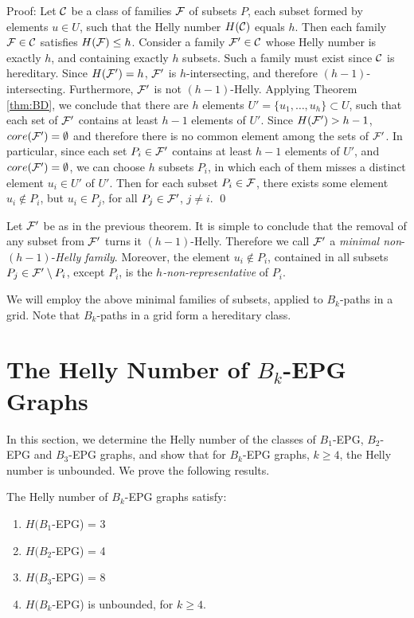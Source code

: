 Proof: 
Let ${\cal C}$ be a class of families ${\cal F}$ of subsets $P$, each subset formed by elements $u \in U$, such that the Helly number $H({\cal C})$ equals $h$. Then each family ${\cal F} \in {\cal C}$ satisfies $H({\cal F}) \leq h$. Consider a family ${\cal F'} \in {\cal C}$  whose Helly number is exactly $h$, and containing exactly $h$ subsets. Such a family must exist since ${\cal C}$ is hereditary. Since $H({\cal F'}) = h$, $\cal F'$ is $h$-intersecting, and therefore $(h-1)$-intersecting. Furthermore, ${\cal F'}$ is not $(h-1)$-Helly. Applying  Theorem \ref{thm:BD}, we conclude that there are $h$ elements $U' = \{u_1, \ldots, u_h\} \subset U$, such that each set of ${\cal F'}$ contains at least $h-1$ elements of $U'$. Since $H({\cal F'}) > h-1$, $core({\cal F'}) = \emptyset$ and therefore there is no common element among the sets of $\cal F'$. In particular, since each set $P_i \in {\cal F'}$ contains at least $h-1$ elements of $U'$, and $core(\cal F') = \emptyset$, we can choose $h$ subsets $P_i$, in which each of them misses a distinct element $u_i \in U'$ of $U'$. Then for each subset $P_i \in \cal F$, there exists some element $u_i \not \in P_i$, but $u_i \in P_j$, for all $P_j \in \cal F'$, $j \neq i$. \qed

Let $\cal{ F'}$ be as in the previous theorem. It is simple to conclude that the removal of any subset from $\cal {F'}$ turns it $(h-1)$-Helly.  Therefore we  call $\cal {F'}$ a {\it minimal non}-$(h-1)$-{\it Helly family}. Moreover, the element $u_i \not \in P_i$, contained in all subsets $P_j \in {\cal{F'}} \setminus P_i$, except $P_i$, is the {\it $h$-non-representative} of $P_i$.  

We will employ the above minimal families of subsets, applied to $B_k$-paths in a grid. Note that $B_k$-paths in a grid form a hereditary class. 

\section{The Helly Number of $B_k$-EPG Graphs}\label{sec:Helly-number}

In this section, we determine the Helly number of the classes of $B_1$-EPG, $B_2$-EPG and $B_3$-EPG graphs, and show that for $B_k$-EPG graphs, $k \geq 4$, the Helly number is unbounded. We prove the following results.

\begin{theorem}\label{thm:Helly-EPG}
The Helly number of $B_k$-EPG graphs satisfy:
\begin{enumerate}[nosep,label=\emph{(\roman*)}]
\item  $H(B_1$-EPG) = 3 
\item $H(B_2$-EPG)  = 4 
\item $H(B_3$-EPG)  = 8 
\item $H(B_k$-EPG) is unbounded, for 
$k \geq 4$.
\end{enumerate}

\end{theorem}

